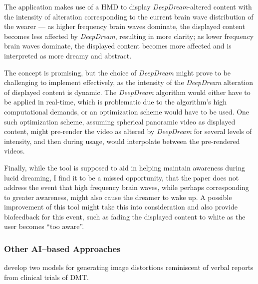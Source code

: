 The application makes use of a \ac{HMD} to display \textit{DeepDream}-altered \autocite{mordvintsev2015inceptionism} content with the intensity of alteration corresponding to the current brain wave distribution of the wearer --- as higher frequency brain waves dominate, the displayed content becomes less affected by \textit{DeepDream}, resulting in more clarity; as lower frequency brain waves dominate, the displayed content becomes more affected and is interpreted as more dreamy and abstract.

The concept is promising, but the choice of \textit{DeepDream} might prove to be challenging to implement effectively, as the intensity of the \textit{DeepDream} alteration of displayed content is dynamic. The \textit{DeepDream} algorithm would either have to be applied in real-time, which is problematic due to the algorithm's high computational demands, or an optimization scheme would have to be used. One such optimization scheme, assuming spherical panoramic video as displayed content, might pre-render the video as altered by \textit{DeepDream} for several levels of intensity, and then during usage, would interpolate between the pre-rendered videos.

Finally, while the tool is supposed to aid in helping maintain awareness during lucid dreaming, I find it to be a missed opportunity, that the paper does not address the event that high frequency brain waves, while perhaps corresponding to greater awareness, might also cause the dreamer to wake up. A possible improvement of this tool might take this into consideration and also provide biofeedback for this event, such as fading the displayed content to white as the user becomes ``too aware''.

\subsubsection{Other AI--based Approaches}
\textcite{schartner2020neural} develop two models for generating image distortions reminiscent of verbal reports from clinical trials of \ac{DMT}.


